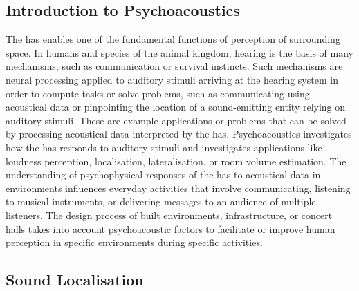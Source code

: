 \subsection{Introduction to Psychoacoustics}\label{sec:bg-psychoacoustics}
The \acrshort{has} enables one of the fundamental functions of perception of surrounding space. In humans and species of the animal kingdom, hearing is the basis of many mechanisms, such as communication or survival instincts. Such mechanisms are neural processing applied to auditory stimuli arriving at the hearing system in order to compute tasks or solve problems, such as communicating using acoustical data or pinpointing the location of a sound-emitting entity relying on auditory stimuli. These are example applications or problems that can be solved by processing acoustical data interpreted by the \acrshort{has}.
Psychoacoustics investigates how the \acrshort{has} responds to auditory stimuli and investigates applications like loudness perception, localisation, lateralisation, or room volume estimation. The understanding of psychophysical responses of the \acrshort{has} to acoustical data in environments influences everyday activities that involve communicating, listening to musical instruments, or delivering messages to an audience of multiple listeners. The design process of built environments, infrastructure, or concert halls takes into account psychoacoustic factors to facilitate or improve human perception in specific environments during specific activities.

\subsection{Sound Localisation}

